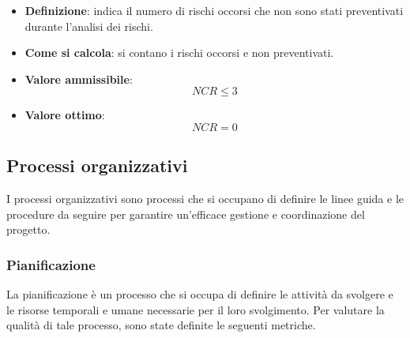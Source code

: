 \hypertarget{32M}{}
\begin{itemize}
	\item \textbf{Definizione}: indica il numero di rischi occorsi che non sono stati preventivati durante l'analisi dei rischi.
	\item \textbf{Come si calcola}: si contano i rischi occorsi e non preventivati.
	\item \textbf{Valore ammissibile}: \begin{equation*}NCR \leq 3\end{equation*}
	\item \textbf{Valore ottimo}: \begin{equation*}NCR = 0\end{equation*}
\end{itemize}




\subsection{Processi organizzativi}
I processi organizzativi sono processi che si occupano di definire le linee guida e le procedure da seguire per garantire un'efficace gestione e coordinazione del progetto.

\subsubsection{Pianificazione}
La pianificazione è un processo che si occupa di definire le attività da svolgere e le risorse temporali e umane necessarie per il loro svolgimento. Per valutare la qualità di tale processo, sono state definite le seguenti metriche.

